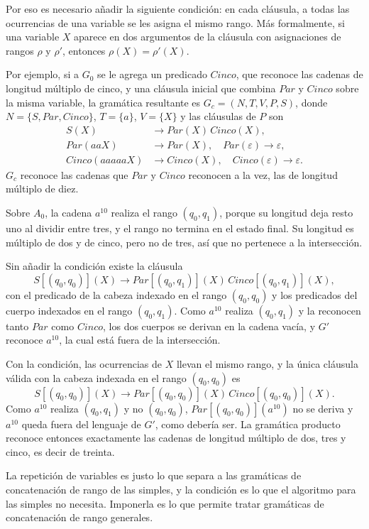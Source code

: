 \documentclass{report}
\theoremstyle{definition}
\theoremstyle{plain}
\theoremstyle{remark}
\begin{document}
Por eso es necesario añadir la siguiente condición: en cada cláusula,
a todas las ocurrencias de una variable se les asigna el mismo rango.
Más formalmente, si una variable $X$ aparece en dos argumentos de la
cláusula con asignaciones de rangos $\rho$ y $\rho'$, entonces
$\rho(X) = \rho'(X)$.

Por ejemplo, si a $G_0$ se le agrega un predicado $Cinco$, que reconoce
las cadenas de longitud múltiplo de cinco, y una cláusula inicial que
combina $Par$ y $Cinco$ sobre la misma variable, la gramática
resultante es $G_c = (N, T, V, P, S)$, donde $N = \{S, Par, Cinco\}$,
$T = \{a\}$, $V = \{X\}$ y las cláusulas de $P$ son
\[
\begin{aligned}
  S(X) &\to Par(X)\,Cinco(X), \\
  Par(aaX) &\to Par(X), \quad Par(\varepsilon) \to \varepsilon, \\
  Cinco(aaaaaX) &\to Cinco(X), \quad Cinco(\varepsilon) \to \varepsilon.
\end{aligned}
\]
$G_c$ reconoce las cadenas que $Par$ y $Cinco$ reconocen a la vez, las
de longitud múltiplo de diez.

Sobre $A_0$, la cadena $a^{10}$ realiza el rango $(q_0, q_1)$, porque su
longitud deja resto uno al dividir entre tres, y el rango no termina en
el estado final. Su longitud es múltiplo de dos y de cinco, pero no de
tres, así que no pertenece a la intersección.

Sin añadir la condición existe la cláusula
\[
  S[(q_0, q_0)](X) \to Par[(q_0, q_1)](X)\,Cinco[(q_0, q_1)](X),
\]
con el predicado de la cabeza indexado en el rango $(q_0, q_0)$ y los
predicados del cuerpo indexados en el rango $(q_0, q_1)$.
Como $a^{10}$ realiza $(q_0, q_1)$ y la reconocen tanto $Par$ como
$Cinco$, los dos cuerpos se derivan en la cadena vacía, y $G'$ reconoce
$a^{10}$, la cual está fuera de la intersección.

Con la condición, las ocurrencias de $X$ llevan el mismo rango, y la
única cláusula válida con la cabeza indexada en el rango $(q_0, q_0)$ es
\[
  S[(q_0, q_0)](X) \to Par[(q_0, q_0)](X)\,Cinco[(q_0, q_0)](X).
\]
Como
$a^{10}$ realiza $(q_0, q_1)$ y no $(q_0, q_0)$,
$Par[(q_0, q_0)](a^{10})$ no se deriva y $a^{10}$ queda fuera del
lenguaje de $G'$, como debería ser. La gramática producto reconoce
entonces exactamente las cadenas de longitud múltiplo de dos, tres y
cinco, es decir de treinta.

La repetición de variables es justo lo que separa a las gramáticas de
concatenación de rango de las simples, y la condición es lo que el
algoritmo para las simples no necesita. Imponerla es lo que permite
tratar gramáticas de concatenación de rango generales.



\end{document}
